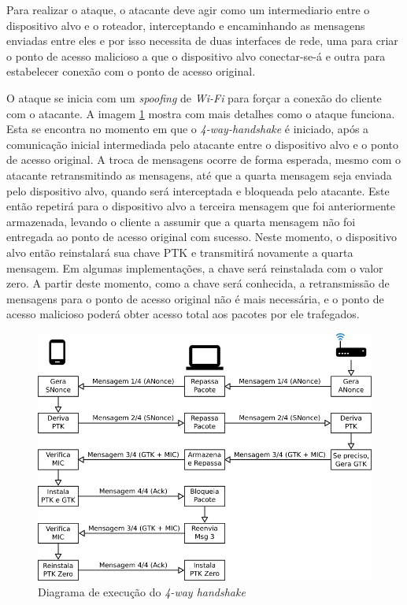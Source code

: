 \documentclass[12pt]{article}
\begin{document}
Para realizar o ataque, o atacante deve agir como um intermediario entre o dispositivo alvo e o roteador,  interceptando e encaminhando as mensagens enviadas entre eles e por isso necessita de duas interfaces de rede, uma para criar o ponto de acesso malicioso a que o dispositivo alvo conectar-se-á e outra para estabelecer conexão com o ponto de acesso original.

O ataque se inicia com um \textit{spoofing} de \textit{Wi-Fi} para forçar a conexão do cliente com o atacante. A imagem \ref{fig:ataque} mostra com mais detalhes como o ataque funciona. Esta se encontra no momento em que o \textit{4-way-handshake} é iniciado, após a comunicação inicial intermediada pelo atacante entre o dispositivo alvo e o ponto de acesso original. A troca de mensagens ocorre de forma esperada, mesmo com o atacante retransmitindo as mensagens, até que a quarta mensagem seja enviada pelo dispositivo alvo, quando será interceptada e bloqueada pelo atacante. Este então repetirá para o dispositivo alvo a terceira mensagem que foi anteriormente armazenada, levando o cliente a assumir que a quarta mensagem não foi entregada ao ponto de acesso original com sucesso. Neste momento, o dispositivo alvo então reinstalará sua chave PTK e transmitirá novamente a quarta mensagem. Em algumas implementações, a chave será reinstalada com o valor zero. A partir deste momento, como a chave será conhecida, a retransmissão de mensagens para o ponto de acesso original não é mais necessária, e o ponto de acesso malicioso poderá obter acesso total aos pacotes por ele trafegados.

\begin{figure}[H]
	\begin{center}
    	\includegraphics[width=15cm]{Ataque.png}
    	\caption{Diagrama de execução do \textit{4-way handshake}}
    	\label{fig:ataque}
	\end{center}		
\end{figure}
\end{document}
